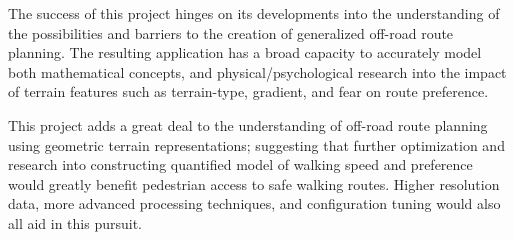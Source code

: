 \documentclass[12pt]{article}
\begin{document}
The success of this project hinges on its developments into the understanding of the possibilities and barriers to the creation of generalized off-road route planning. The resulting application has a broad capacity to accurately model both mathematical concepts, and physical/psychological research into the impact of terrain features such as terrain-type, gradient, and fear on route preference.

This project adds a great deal to the understanding of off-road route planning using geometric terrain representations; suggesting that further optimization and research into constructing quantified model of walking speed and preference would greatly benefit pedestrian access to safe walking routes. Higher resolution data, more advanced processing techniques, and configuration tuning would also all aid in this pursuit.

\pagebreak

\nocite{esa2024dem}
\nocite{cgal:eb-24b}
\nocite{gdal}
\nocite{wiki:osm}
\nocite{gtest}
\nocite{fmtlib}
\nocite{opencv_library}
\nocite{oneTBB}
\nocite{tin_terrain_logging}
\nocite{libboost}
\nocite{geographiclib}
\nocite{gearth}
\nocite{blender}

\printbibliography[heading=bibnumbered]{}
\end{document}
